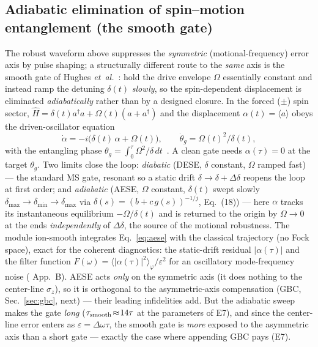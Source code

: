 \documentclass[aps,prapplied,twocolumn,superscriptaddress,floatfix,nofootinbib]{revtex4-2}
\begin{document}
\subsection{Adiabatic elimination of spin--motion entanglement (the smooth gate)}\label{sec:smooth}
The robust waveform above suppresses the \emph{symmetric} (motional-frequency) error axis by pulse
shaping; a structurally different route to the \emph{same} axis is the smooth gate of Hughes
\emph{et~al.}~\cite{Hughes25}: hold the drive envelope $\Omega$ essentially constant and instead ramp
the detuning $\delta(t)$ \emph{slowly}, so the spin-dependent displacement is eliminated
\emph{adiabatically} rather than by a designed closure. In the forced ($\pm$) spin sector,
$\hat H=\delta(t)a^\dagger a+\Omega(t)(a+a^\dagger)$ and the displacement $\alpha(t)=\langle a\rangle$
obeys the driven-oscillator equation
\begin{equation}
\dot\alpha=-i\big(\delta(t)\,\alpha+\Omega(t)\big),\qquad \dot\theta_g=\Omega(t)^2/\delta(t),
\label{eq:aese}
\end{equation}
with the entangling phase $\theta_g=\int_0^\tau\Omega^2/\delta\,dt$~\cite{Hughes25}. A clean gate
needs $\alpha(\tau)=0$ at the target $\theta_g$. Two limits close the loop: \emph{diabatic} (DESE,
$\delta$ constant, $\Omega$ ramped fast) --- the standard MS gate, resonant so a static drift
$\delta\!\to\!\delta+\Delta\delta$ reopens the loop at first order; and \emph{adiabatic} (AESE,
$\Omega$ constant, $\delta(t)$ swept slowly $\delta_{\max}\!\to\!\delta_{\min}\!\to\!\delta_{\max}$
via $\delta(s)=(b+c\,g(s))^{-1/j}$, \cite{Hughes25} Eq.~(18)) --- here $\alpha$ tracks its
instantaneous equilibrium $-\Omega/\delta(t)$ and is returned to the origin by $\Omega\!\to\!0$ at
the ends \emph{independently} of $\Delta\delta$, the source of the motional robustness. The module
\textsf{ion-smooth} integrates Eq.~\eqref{eq:aese} with the classical trajectory (no Fock space),
exact for the coherent diagnostics: the static-drift residual $|\alpha(\tau)|$ and the filter
function $F(\omega)=\langle|\alpha(\tau)|^2\rangle_\varphi/\varepsilon^2$ for an oscillatory
mode-frequency noise (\cite{Hughes25} App.~B). AESE acts \emph{only} on the symmetric axis (it does
nothing to the center-line $\sigma_z$), so it is orthogonal to the asymmetric-axis compensation
(GBC, Sec.~\ref{sec:gbc}, next) --- their leading infidelities add. But the adiabatic sweep makes
the gate \emph{long} ($\tau_{\rm smooth}\!\approx\!14\tau$ at the parameters of E7), and since the
center-line error enters as $\varepsilon=\Delta\omega\tau$, the smooth gate is \emph{more} exposed to
the asymmetric axis than a short gate --- exactly the case where appending GBC pays (E7).
\end{document}
